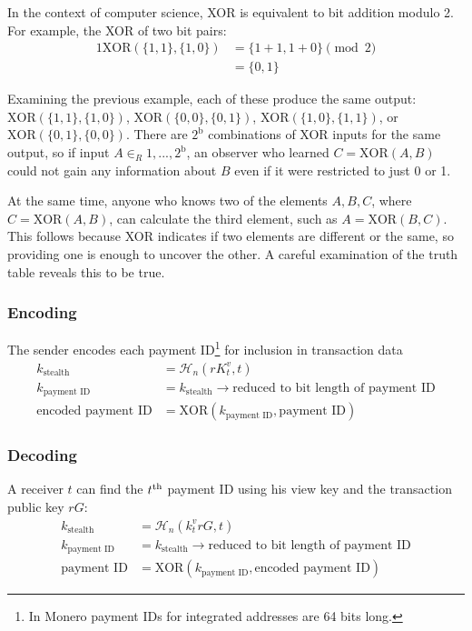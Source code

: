 In the context of computer science, XOR is equivalent to bit addition modulo 2. For example, the XOR of two bit pairs:
\begin{alignat*}{1}
    \text{XOR}(\{1,1\},\{1,0\}) &= \{1+1,1+0\} \pmod 2 \\
                                &= \{0,1\} 
\end{alignat*}

Examining the previous example, each of these produce the same output: $\text{XOR}(\{1,1\},\{1,0\})$, $\text{XOR}(\{0,0\},\{0,1\})$, $\text{XOR}(\{1,0\},\{1,1\})$, or $\text{XOR}(\{0,1\},\{0,0\})$. There are $2^{\text{b}}$ combinations of XOR inputs for the same output, so if input $A \in_R 1,...,2^{\text{b}}$, an observer who learned $C = \text{XOR}(A,B)$ could not gain any information about $B$ even if it were restricted to just 0 or 1.

At the same time, anyone who knows two of the elements $A,B,C$, where $C = \text{XOR}(A,B)$, can calculate the third element, such as $A = \text{XOR}(B,C)$. This follows because XOR indicates if two elements are different or the same, so providing one is enough to uncover the other. A careful examination of the truth table reveals this to be true.
    
\subsubsection*{Encoding}

The sender encodes each payment ID\footnote{In Monero payment IDs for integrated addresses are 64 bits long.} for inclusion in transaction data\\
\begin{align*}
         k_{\textrm{stealth}} &= \mathcal{H}_n(r K_t^v, t) \\
      k_{\textrm{payment ID}} &= k_{\textrm{stealth}} \rightarrow \textrm{reduced to bit length of payment ID}\\
  \textrm{encoded payment ID} &= \textrm{XOR}(k_{\textrm{payment ID}}, \textrm{payment ID})
\end{align*}
    
\subsubsection*{Decoding}

A receiver $t$ can find the $t\textsuperscript{th}$ payment ID using his view key and the transaction public key $r G$: \\
\begin{align*}
         k_{\textrm{stealth}} &= \mathcal{H}_n(k_t^v r G, t) \\
      k_{\textrm{payment ID}} &= k_{\textrm{stealth}} \rightarrow \textrm{reduced to bit length of payment ID}\\
          \textrm{payment ID} &= \textrm{XOR}(k_{\textrm{payment ID}}, \textrm{encoded payment ID})
\end{align*}



